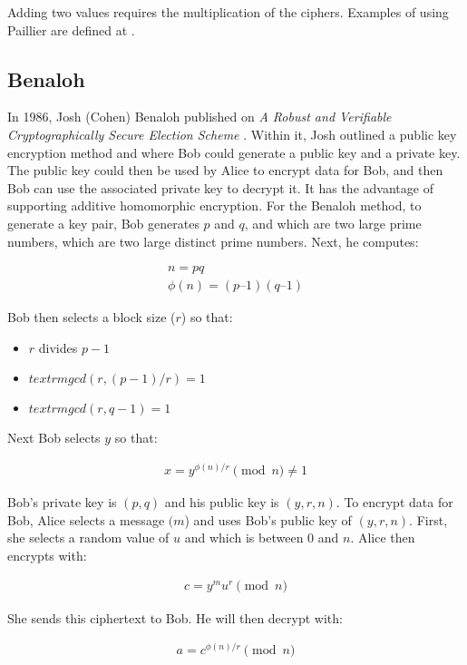 \documentclass[envcountsame,runningheads,notitlepage]{llncs}
\begin{document}
Adding two values requires the multiplication of the ciphers. Examples of using Paillier are defined at  \cite{asecuritysite_06138}. 

\subsection{Benaloh}
In 1986, Josh (Cohen) Benaloh published on \emph{A Robust and Verifiable Cryptographically Secure Election Scheme} \cite{cohen1985robust,asecuritysite_15987}. Within it, Josh outlined a public key encryption method and where Bob could generate a public key and a private key. The public key could then be used by Alice to encrypt data for Bob, and then Bob can use the associated private key to decrypt it. It has the advantage of supporting additive homomorphic encryption. For the Benaloh method, to generate a key pair, Bob generates $p$ and $q$, and which are two large prime numbers, which are two large distinct prime numbers. Next, he computes:

\begin{align}
n = pq\\
\phi(n) = (p – 1)(q – 1)
\end{align}

Bob then selects a block size ($r$) so that:

\begin{itemize}
    \item $r$ divides $p - 1$
    \item $textrm{gcd}(r, (p - 1) / r) = 1$
    \item $textrm{gcd}(r, q - 1) = 1$
\end{itemize}

Next Bob selects $y$ so that:

\begin{align}
x = y^{\phi(n) / r} \pmod n \neq 1 
\end{align}

Bob's private key is $(p, q)$  and his public key is  $(y, r, n)$. To encrypt data for Bob, Alice selects a message $(m$) and uses Bob's public key of $(y, r, n) $. First, she selects a random value of $u$ and which is between 0 and $n$.  Alice then encrypts with:

\begin{align}
c = y^m u^r \pmod n
\end{align}

She sends this ciphertext to Bob. He will then decrypt with:

\begin{align}
a = c^{\phi(n ) / r} \pmod n
\end{align}
\end{document}
